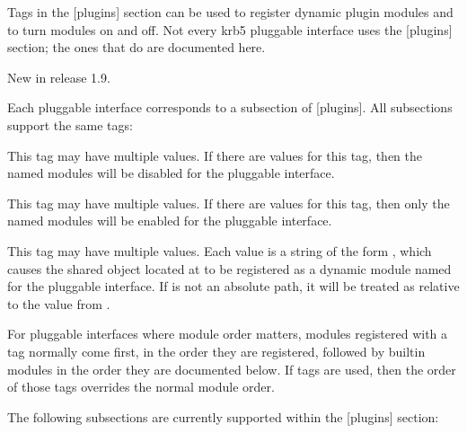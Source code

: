 \documentclass[letterpaper,10pt,english]{sphinxmanual}
\begin{document}
\sphinxAtStartPar
Tags in the {[}plugins{]} section can be used to register dynamic plugin
modules and to turn modules on and off.  Not every krb5 pluggable
interface uses the {[}plugins{]} section; the ones that do are documented
here.

\sphinxAtStartPar
New in release 1.9.

\sphinxAtStartPar
Each pluggable interface corresponds to a subsection of {[}plugins{]}.
All subsections support the same tags:
\begin{description}
\sphinxAtStartPar
This tag may have multiple values. If there are values for this
tag, then the named modules will be disabled for the pluggable
interface.

\sphinxAtStartPar
This tag may have multiple values. If there are values for this
tag, then only the named modules will be enabled for the pluggable
interface.

\sphinxAtStartPar
This tag may have multiple values.  Each value is a string of the
form , which causes the shared object
located at  to be registered as a dynamic module named
 for the pluggable interface.  If  is not an
absolute path, it will be treated as relative to the
 value from {\hyperref[\detokenize{admin/conf_files/krb5_conf:libdefaults}]{}}.

\end{description}

\sphinxAtStartPar
For pluggable interfaces where module order matters, modules
registered with a  tag normally come first, in the order
they are registered, followed by built\sphinxhyphen{}in modules in the order they
are documented below.  If  tags are used, then the
order of those tags overrides the normal module order.

\sphinxAtStartPar
The following subsections are currently supported within the {[}plugins{]}
section:
\end{document}
